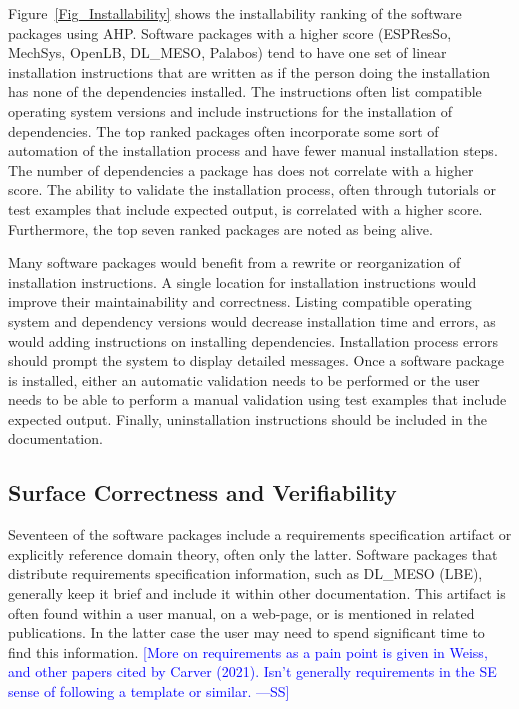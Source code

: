 \documentclass[final, 3p, times, authoryear]{elsarticle}
\newcommand{\authornote}[3]{\textcolor{#1}{[#3 ---#2]}}
\newcommand{\authornote}[3]{}
\newcommand{\wss}[1]{\authornote{blue}{SS}{#1}} %
\begin{document}
Figure~\ref{Fig_Installability} shows the installability ranking of the software
packages using AHP. Software packages with a higher score (ESPResSo, MechSys, OpenLB, DL\_MESO, Palabos) tend to have one set of linear installation instructions that are written as if the person doing the installation has none of the dependencies installed. The instructions often list compatible operating system versions and include instructions for the installation of dependencies. The top ranked packages often incorporate some sort of automation of the installation process and have fewer manual installation steps. The number of dependencies a package has does not correlate with a higher score. The ability to validate the installation process, often through tutorials or test examples that include expected output, is correlated with a higher score. Furthermore, the top seven ranked packages are noted as being alive. 

Many software packages would benefit from a rewrite or reorganization of
installation instructions. A single location for installation instructions would
improve their maintainability and correctness. Listing compatible operating
system and dependency versions would decrease installation time and errors, as
would adding instructions on installing dependencies. Installation process
errors should prompt the system to display detailed messages. Once a software
package is installed, either an automatic validation needs to be performed or
the user needs to be able to perform a manual validation using test examples
that include expected output. Finally, uninstallation instructions should be
included in the documentation. 
 
\subsection{Surface Correctness and Verifiability}

Seventeen of the software packages include a requirements specification artifact
or explicitly reference domain theory, often only the latter. Software packages
that distribute requirements specification information, such as DL\_MESO (LBE),
generally keep it brief and include it within other documentation. This artifact
is often found within a user manual, on a web-page, or is mentioned in related
publications. In the latter case the user may need to spend significant time to
find this information.  \wss{More on requirements as a pain point is given in
Weiss, and other papers cited by Carver (2021).  Isn't generally requirements in
the SE sense of following a template or similar.}
\end{document}
